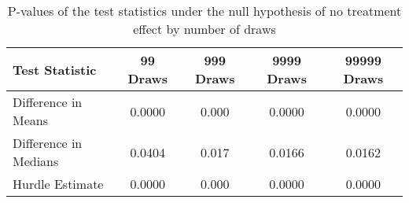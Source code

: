 \begin{table}[h]
\centering\begingroup

\begin{tabular}{lcccc}
\toprule
Test Statistic & 99 Draws & 999 Draws & 9999 Draws & 99999 Draws\\
\midrule
Difference in Means & 0.0000 & 0.000 & 0.0000 & 0.0000\\
Difference in Medians & 0.0404 & 0.017 & 0.0166 & 0.0162\\
Hurdle Estimate & 0.0000 & 0.000 & 0.0000 & 0.0000\\
\bottomrule
\end{tabular}
\endgroup{}

\caption{\label{tab:p_values_all_draws}P-values of the test statistics under the null hypothesis of no treatment effect by number of draws}
\end{table}
